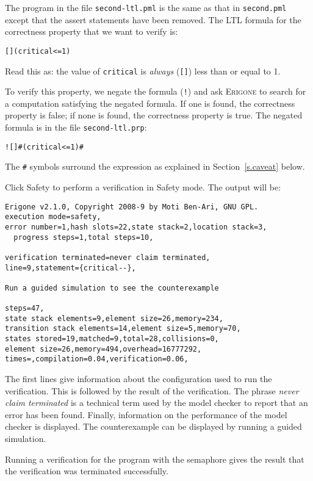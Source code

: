 \documentclass[11pt]{article}
\newcommand*{\prg}{\textsc{Erigone}}
\newcommand*{\p}[1]{\texttt{#1}}
\newcommand*{\bu}[1]{\textsf{#1}}
\begin{document}
The program in the file \p{second-ltl.pml} is the same as that in
\p{second.pml} except that the assert statements have been removed. The
LTL formula for the correctness property that we want to verify is:

\begin{verbatim}
[](critical<=1)
\end{verbatim}
Read this as: the value of \p{critical} is \emph{always} (\p{[]}) less
than or equal to 1.

To verify this property, we negate the formula (\p{!}) and ask \prg{} to
search for a computation satisfying the negated formula. If one is
found, the correctness property is false; if none is found, the
correctness property is true. The negated formula is in the file
\p{second-ltl.prp}:

\begin{verbatim}
![]#(critical<=1)#
\end{verbatim}
The \p{\#} symbols surround the expression as explained in
Section~\ref{s.caveat} below.

Click \bu{Safety} to perform a verification in Safety mode. The output will be:

\begin{verbatim}
Erigone v2.1.0, Copyright 2008-9 by Moti Ben-Ari, GNU GPL.
execution mode=safety,
error number=1,hash slots=22,state stack=2,location stack=3,
  progress steps=1,total steps=10,

verification terminated=never claim terminated,
line=9,statement={critical--},

Run a guided simulation to see the counterexample

steps=47,
state stack elements=9,element size=26,memory=234,
transition stack elements=14,element size=5,memory=70,
states stored=19,matched=9,total=28,collisions=0,
element size=26,memory=494,overhead=16777292,
times=,compilation=0.04,verification=0.06,
\end{verbatim}

The first lines give information about the configuration used to run the
verification. This is followed by the result of the verification. The
phrase \emph{never claim terminated} is a technical term used by the
model checker to report that an error has been found. Finally,
information on the performance of the model checker is displayed. The
counterexample can be displayed by running a guided simulation.

Running a verification for the program with the semaphore gives the
result that the verification was terminated successfully.
\end{document}
